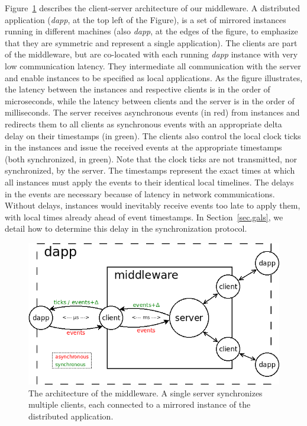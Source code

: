\documentclass[sigplan,screen]{acmart}
\newcommand{\dapp}{\emph{dapp}\xspace}
\begin{document}
Figure~\ref{fig.middleware} describes the client-server architecture of our
middleware.
A distributed application (\dapp, at the top left of the Figure), is a set of
mirrored instances running in different machines (also \dapp, at the edges of
the figure, to emphasize that they are symmetric and represent a single
application).
The clients are part of the middleware, but are co-located with each running
\dapp instance with very low communication latency.
They intermediate all communication with the server and enable instances to be
specified as local applications.
As the figure illustrates, the latency between the instances and respective
clients is in the order of microseconds, while the latency between clients and
the server is in the order of milliseconds.
The server receives asynchronous events (in red) from instances and redirects
them to all clients as synchronous events with an appropriate delta delay on
their timestamps (in green).
The clients also control the local clock ticks in the instances and issue the
received events at the appropriate timestamps (both synchronized, in green).
Note that the clock ticks are not transmitted, nor synchronized, by the server.
%
The timestamps represent the exact times at which all instances must apply the
events to their identical local timelines.
The delays in the events are necessary because of latency in network
communications.
Without delays, instances would inevitably receive events too late to apply
them, with local times already ahead of event timestamps.
In Section~\ref{sec.gals}, we detail how to determine this delay in the
synchronization protocol.

\begin{figure}[t]
  \centering
  \includegraphics[width=\linewidth]{middleware}
  \caption{
    \label{fig.middleware}
    The architecture of the middleware.
    A single server synchronizes multiple clients, each connected to a mirrored
    instance of the distributed application.
  }
\end{figure}
\end{document}
